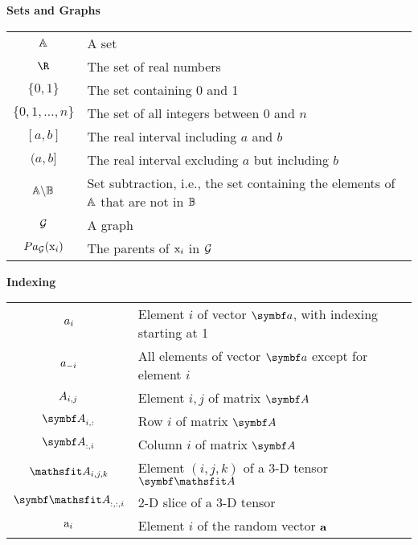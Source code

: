 \vspace{\notationgap}
\begin{minipage}{0.9\textwidth}
  \centerline{\bf Sets and Graphs}
  \bgroup
  \def\arraystretch{1.5}
  \begin{tabular}{cp{3.25in}}
    $\displaystyle {\mathbb{A}}$ & A set\\
    $\displaystyle \R$ & The set of real numbers \\
    $\displaystyle \{0, 1\}$ & The set containing 0 and 1 \\
    $\displaystyle \{0, 1, \dots, n \}$ & The set of all integers between $0$ and $n$\\
    $\displaystyle [a, b]$ & The real interval including $a$ and $b$\\
    $\displaystyle (a, b]$ & The real interval excluding $a$ but including $b$\\
    $\displaystyle {\mathbb{A}} \backslash {\mathbb{B}}$ & Set subtraction, i.e., the set containing the elements of ${\mathbb{A}}$ that are not in ${\mathbb{B}}$\\
    $\displaystyle {\mathcal{G}}$ & A graph\\
    $\displaystyle Pa_{\mathcal{G}}({\textnormal{x}}_i)$ & The parents of ${\textnormal{x}}_i$ in ${\mathcal{G}}$
  \end{tabular}
  \egroup
\end{minipage}

\vspace{\notationgap}
\begin{minipage}{0.9\textwidth}
  \centerline{\bf Indexing}
  \bgroup
  \def\arraystretch{1.5}
  \begin{tabular}{cp{3.25in}}
    $\displaystyle {a}_i$ & Element $i$ of vector $\va$, with indexing starting at 1 \\
    $\displaystyle {a}_{-i}$ & All elements of vector $\va$ except for element $i$ \\
    $\displaystyle {A}_{i,j}$ & Element $i, j$ of matrix $\mA$ \\
    $\displaystyle \mA_{i, :}$ & Row $i$ of matrix $\mA$ \\
    $\displaystyle \mA_{:, i}$ & Column $i$ of matrix $\mA$ \\
    $\displaystyle \etA_{i, j, k}$ & Element $(i, j, k)$ of a 3-D tensor $\tA$\\
    $\displaystyle \tA_{:, :, i}$ & 2-D slice of a 3-D tensor\\
    $\displaystyle {\textnormal{a}}_i$ & Element $i$ of the random vector ${\mathbf{a}}$ \\
  \end{tabular}
  \egroup
\end{minipage}

